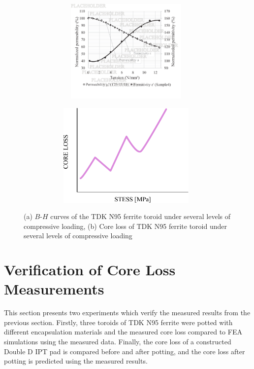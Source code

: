 \documentclass[conference]{IEEEtran}
\begin{document}
\begin{figure}[t]
  \centering
  \begin{subfigure}{\columnwidth}
    \includegraphics[width=3.5in, height=2in]{figures/changingBH.pdf}
    \caption{}
    \label{fig:changingBH}
  \end{subfigure}
  \begin{subfigure}{\columnwidth}
    \centering
    \includegraphics[width=3.5in, height=2in]{figures/coreloss.pdf}
    \caption{}
    \label{fig:coreloss}
  \end{subfigure}
  \caption{(a) $B$-$H$ curves of the TDK N95 ferrite toroid under several levels of compressive loading, (b) Core loss of TDK N95 ferrite toroid under several levels of compressive loading}
\end{figure}

\section{Verification of Core Loss Measurements}

This section presents two experiments which verify the measured results from the previous section. 
Firstly, three toroids of TDK N95 ferrite were potted with different encapsulation materials and the measured core loss compared to FEA simulations using the measured data. 
Finally, the core loss of a constructed Double D IPT pad is compared before and after potting, and the core loss after potting is predicted using the measured results. 
\end{document}
